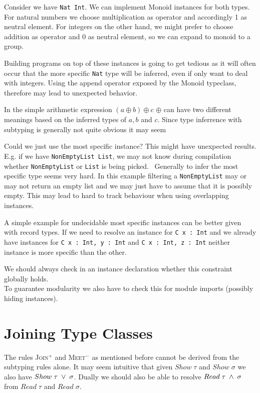   Consider we have \texttt{Nat \sub Int}.
  We can implement Monoid instances for both types. For natural numbers we choose multiplication as operator and accordingly 1 as neutral element.
  For integers on the other hand, we might prefer to choose addition as operator and 0 as neutral element, so we can expand to monoid to a group.

  Building programs on top of these instances is going to get tedious as it will often occur that the more specific \texttt{Nat} type will be inferred,
  even if only want to deal with integers.
  Using the append operator exposed by the Monoid typeclass, therefore may lead to unexpected behavior.

  In the simple arithmetic expression $(a \oplus b) \oplus c$ $\oplus$ can have two different meanings based on the inferred types of $a,b$ and $c$.
  Since type inferrence with subtyping is generally not quite obvious it may seem 

  Could we just use the most specific instance? This might have unexpected results.
  E.g. if we have \texttt{NonEmptyList \sub List}, we may not know during compilation whether \texttt{NonEmptyList} or \texttt{List} is being picked.
  ~Generally to infer the most specific type seems very hard. In this example filtering a \texttt{NonEmptyList} may or may not return an empty list and we may just have to assume that it is possibly empty.
  This may lead to hard to track behaviour when using overlapping instances.

  A simple example for undecidable most specific instances can be better given with record types.
  If we need to resolve an instance for \texttt{C {x : Int}} and we already have instances for \texttt{C {x : Int, y : Int}} and \texttt{C {x : Int, z : Int}} neither instance is more specific than the other.


  We should always check in an instance declaration whether this constraint globally holds. \\
  To guarantee modularity we also have to check this for module imports (possibly hiding instances).

\section{Joining Type Classes}

The rules \textsc{Join}$^+$ and \textsc{Meet}$^-$ as mentioned before cannot be derived from the subtyping rules alone.
It may seem intuitive that given $Show \; \tau$ and $Show \; \sigma$ we also have $Show \; \tau \; \vee \; \sigma$.
Dually we should also be able to resolve $Read \; \tau \; \wedge \; \sigma$ from $Read \; \tau$ and $Read \; \sigma$.

